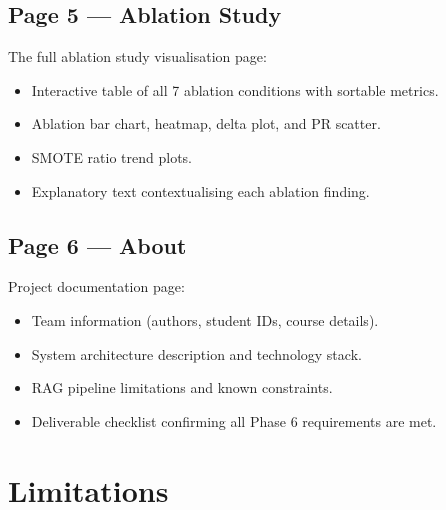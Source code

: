 \documentclass[12pt,a4paper]{article}
\begin{document}
\subsection{Page 5 --- Ablation Study}

The full ablation study visualisation page:
\begin{itemize}[noitemsep]
  \item Interactive table of all 7 ablation conditions with sortable metrics.
  \item Ablation bar chart, heatmap, delta plot, and PR scatter.
  \item SMOTE ratio trend plots.
  \item Explanatory text contextualising each ablation finding.
\end{itemize}

\subsection{Page 6 --- About}

Project documentation page:
\begin{itemize}[noitemsep]
  \item Team information (authors, student IDs, course details).
  \item System architecture description and technology stack.
  \item RAG pipeline limitations and known constraints.
  \item Deliverable checklist confirming all Phase 6 requirements are met.
\end{itemize}

\section{Limitations}

\label{sec:limitations}
\end{document}
